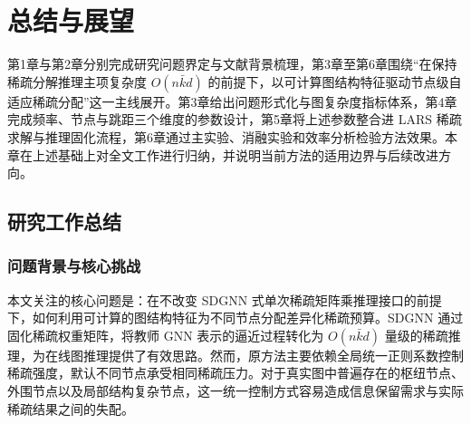 

\chapter{总结与展望}\label{chap:7}

第1章与第2章分别完成研究问题界定与文献背景梳理，第3章至第6章围绕“在保持稀疏分解推理主项复杂度 $O(n\bar{k}d)$ 的前提下，以可计算图结构特征驱动节点级自适应稀疏分配”这一主线展开。第3章给出问题形式化与图复杂度指标体系，第4章完成频率、节点与跳距三个维度的参数设计，第5章将上述参数整合进 LARS 稀疏求解与推理固化流程，第6章通过主实验、消融实验和效率分析检验方法效果。本章在上述基础上对全文工作进行归纳，并说明当前方法的适用边界与后续改进方向。

\section{研究工作总结}\label{sec:ch7-summary}

\subsection{问题背景与核心挑战}\label{subsec:ch7-background}

本文关注的核心问题是：在不改变 SDGNN 式单次稀疏矩阵乘推理接口的前提下，如何利用可计算的图结构特征为不同节点分配差异化稀疏预算。SDGNN 通过固化稀疏权重矩阵，将教师 GNN 表示的逼近过程转化为 $O(n\bar{k}d)$ 量级的稀疏推理，为在线图推理提供了有效思路。然而，原方法主要依赖全局统一正则系数控制稀疏强度，默认不同节点承受相同稀疏压力。对于真实图中普遍存在的枢纽节点、外围节点以及局部结构复杂节点，这一统一控制方式容易造成信息保留需求与实际稀疏结果之间的失配。

